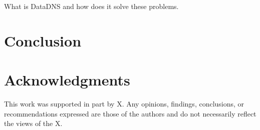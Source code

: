 \documentclass{sig-alternate}
\begin{document}
What is DataDNS and how does it solve these problems.

\section{Conclusion}




\section{Acknowledgments}
This work was supported in part by X. Any opinions, findings, conclusions, or recommendations expressed are those of the authors and do not necessarily reflect the views of the X.


  
\end{document}

